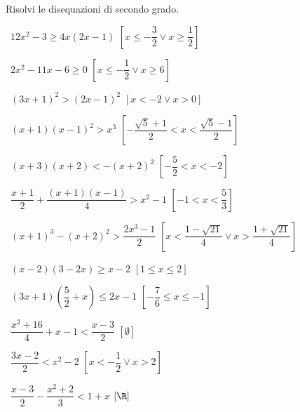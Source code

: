 % 
% 
% 

\begin{esercizio}[\Ast]
 \label{ese:4.17}
Risolvi le disequazioni di secondo grado.
\vspace{\dy}
 \begin{enumeratea}
 \item~\(12x^2-3\ge 4x(2x-1)\) 
  \hfill \(\left[x\le -\dfrac 3 2\vee x\ge \dfrac 1 2\right]\)
 \item~\(2x^2-11x-6\ge 0\) 
  \hfill \(\left[x\le -\dfrac 1 2\vee x\ge 6\right]\)
 \item~\((3x+1)^2>(2x-1)^2\) 
  \hfill \(\left[x<-2\vee x>0\right]\)
 \item~\((x+1)(x-1)^2>x^3\) 
  \hfill \(\left[-\dfrac{\sqrt 5+1} 2<x<\dfrac{\sqrt 5-1} 2\right]\)
 \item~\((x+3)(x+2)<-(x+2)^2\)
  \hfill \(\left[-\dfrac 5 2<x<-2\right]\)
 \item~\(\dfrac{x+1} 2+\dfrac{(x+1)(x-1)} 4>x^2-1\)
  \hfill \(\left[-1<x<\dfrac 5 3\right]\)
 \item~\((x+1)^3-(x+2)^2>\dfrac{2x^3-1} 2\)
  \hfill \(\left[x<\dfrac{1-\sqrt{21}} 4\vee x>\dfrac{1+\sqrt{21}} 4\right]\)
 \item~\((x-2)(3-2x)\ge x-2\)
  \hfill \(\left[1\le x\le 2\right]\)
 \item~\((3x+1)\left(\dfrac 5 2+x\right)\le 2x-1\)
  \hfill \(\left[-\dfrac 7 6\le x\le -1\right]\)
 \item~\(\dfrac{x^2+16} 4+x-1<\dfrac{x-3} 2\)
  \hfill \(\left[\emptyset\right]\)
 \item~\(\dfrac{3x-2} 2<x^2-2\)
  \hfill \(\left[x<-\dfrac 1 2\vee x>2\right]\)
 \item~\(\dfrac{x-3} 2-\dfrac{x^2+2} 3<1+x\)
  \hfill \(\left[\R\right]\)
 \end{enumeratea}
\end{esercizio}

